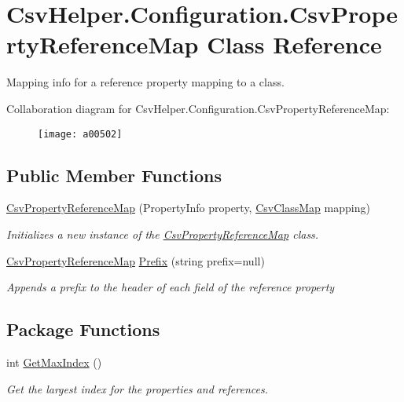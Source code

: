\hypertarget{a00075}{\section{Csv\-Helper.\-Configuration.\-Csv\-Property\-Reference\-Map Class Reference}
\label{a00075}
}


Mapping info for a reference property mapping to a class.  




Collaboration diagram for Csv\-Helper.\-Configuration.\-Csv\-Property\-Reference\-Map\-:
\nopagebreak
\begin{figure}[H]
\begin{center}
\leavevmode
\texttt{[image: a00502]}
\end{center}
\end{figure}
\subsection*{Public Member Functions}
\begin{DoxyCompactItemize}
\item 
\hyperlink{a00075_a02823d2439667bca75233abbe81651ff}{Csv\-Property\-Reference\-Map} (Property\-Info property, \hyperlink{a00060}{Csv\-Class\-Map} mapping)
\begin{DoxyCompactList}\small\item\em Initializes a new instance of the \hyperlink{a00075}{Csv\-Property\-Reference\-Map} class. \end{DoxyCompactList}\item 
\hyperlink{a00075}{Csv\-Property\-Reference\-Map} \hyperlink{a00075_a0ed653de99ec2251fd99837740693789}{Prefix} (string prefix=null)
\begin{DoxyCompactList}\small\item\em Appends a prefix to the header of each field of the reference property \end{DoxyCompactList}\end{DoxyCompactItemize}
\subsection*{Package Functions}
\begin{DoxyCompactItemize}
\item 
int \hyperlink{a00075_a1e879f9a6ed84415ac52c44f1f086606}{Get\-Max\-Index} ()
\begin{DoxyCompactList}\small\item\em Get the largest index for the properties and references. \end{DoxyCompactList}\end{DoxyCompactItemize}
